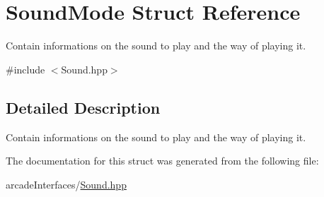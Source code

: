\hypertarget{struct_sound_mode}{}\section{Sound\+Mode Struct Reference}
\label{struct_sound_mode}


Contain informations on the sound to play and the way of playing it.  




{\ttfamily \#include $<$Sound.\+hpp$>$}



\subsection{Detailed Description}
Contain informations on the sound to play and the way of playing it. 

The documentation for this struct was generated from the following file\+:\begin{DoxyCompactItemize}
\item 
arcade\+Interfaces/\hyperlink{_sound_8hpp}{Sound.\+hpp}\end{DoxyCompactItemize}
